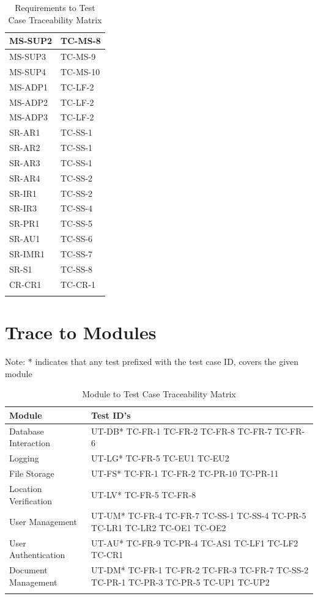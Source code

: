 \documentclass[12pt, titlepage]{article}
\begin{document}
\begin{longtable}{|l|l|}
  MS-SUP2 & TC-MS-8 \\ \hline
  MS-SUP3 & TC-MS-9 \\ \hline
  MS-SUP4 & TC-MS-10 \\ \hline
  MS-ADP1 & TC-LF-2 \\ \hline
  MS-ADP2 & TC-LF-2 \\ \hline
  MS-ADP3 & TC-LF-2 \\ \hline
  SR-AR1 & TC-SS-1 \\ \hline
  SR-AR2 & TC-SS-1 \\ \hline
  SR-AR3 & TC-SS-1 \\ \hline
  SR-AR4 & TC-SS-2 \\ \hline
  SR-IR1 & TC-SS-2 \\ \hline
  SR-IR3 & TC-SS-4 \\ \hline
  SR-PR1 & TC-SS-5\\ \hline
  SR-AU1 & TC-SS-6 \\ \hline
  SR-IMR1 & TC-SS-7 \\ \hline
  SR-S1 & TC-SS-8 \\ \hline
  CR-CR1 & TC-CR-1 \\ \hline
  \caption{Requirements to Test Case Traceability Matrix}
\end{longtable}

\section{Trace to Modules}

Note: * indicates that any test prefixed with the test case ID,
covers the given module

\begin{longtable}{|m{5cm}|m{9cm}|}
  \hline
  \textbf{Module} & \textbf{Test ID's} \\
  \hline
  Database Interaction & UT-DB* TC-FR-1 TC-FR-2 TC-FR-8 TC-FR-7 TC-FR-6\\ \hline
  Logging & UT-LG* TC-FR-5 TC-EU1 TC-EU2\\ \hline
  File Storage & UT-FS* TC-FR-1 TC-FR-2 TC-PR-10 TC-PR-11\\ \hline
  Location Verification & UT-LV* TC-FR-5 TC-FR-8\\ \hline
  User Management & UT-UM* TC-FR-4 TC-FR-7 TC-SS-1 TC-SS-4 TC-PR-5 TC-LR1 TC-LR2 TC-OE1 TC-OE2 \\ \hline
  User Authentication & UT-AU* TC-FR-9 TC-PR-4 TC-AS1 TC-LF1 TC-LF2 TC-CR1\\ \hline
  Document Management & UT-DM* TC-FR-1 TC-FR-2 TC-FR-3 TC-FR-7 TC-SS-2 TC-PR-1 TC-PR-3 TC-PR-5 TC-UP1 TC-UP2\\ \hline
  \caption{Module to Test Case Traceability Matrix}
\end{longtable}
\end{document}
